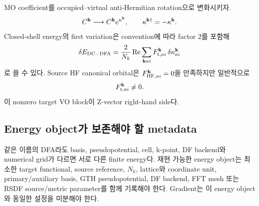 MO coefficient를 occupied--virtual anti-Hermitian rotation으로 변화시키자.
\begin{equation}
  C^{\mathbf{k}}\longrightarrow C^{\mathbf{k}}e^{\kappa^{\mathbf{k}}},
  \qquad \kappa^{\mathbf{k}\dagger}=-\kappa^{\mathbf{k}}.
  \label{eq:orbital-rotation}
\end{equation}
Closed-shell energy의 first variation은 convention에 따라 factor $2$를 포함해
\begin{equation}
  \delta E_{\mathrm{DC-DFA}}
  =\frac{2}{N_k}\operatorname{Re}
   \sum_{\mathbf{k} ai}F_{\mathrm t,ai}^{\mathbf{k}}\,
   \delta\kappa_{ai}^{\mathbf{k}}
  \label{eq:target-orbital-gradient}
\end{equation}
로 쓸 수 있다. Source HF canonical orbital은
$F_{\mathrm{HF},ai}^{\mathbf{k}}=0$을 만족하지만 일반적으로
\begin{equation}
  F_{\mathrm t,ai}^{\mathbf{k}}\ne0.
  \label{eq:target-vo-nonzero}
\end{equation}
이 nonzero target VO block이 Z-vector right-hand side다.

\subsection{Energy object가 보존해야 할 metadata}

같은 이름의 DFA라도 basis, pseudopotential, cell, k-point, DF backend와 numerical
grid가 다르면 서로 다른 finite energy다. 재현 가능한 energy object는 최소한 target
functional, source reference, $N_k$, lattice와 coordinate unit, primary/auxiliary basis,
GTH pseudopotential, DF backend, FFT mesh 또는 RSDF source/metric parameter를 함께
기록해야 한다. Gradient는 이 energy object와 동일한 설정을 미분해야 한다.
